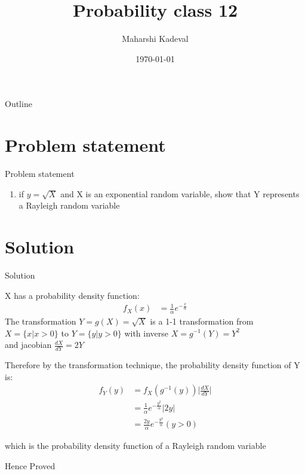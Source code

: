 \documentclass{beamer}
\title{Probability class 12}
\author{Maharshi Kadeval}
\date{\today}
\providecommand{\brak}[1]{\ensuremath{\left(#1\right)}}
\begin{document}
\begin{frame}
    \titlepage 
\end{frame}

\logo{}


\begin{frame}{Outline}
    \tableofcontents
\end{frame}


\section{Problem statement}
\begin{frame}{Problem statement}
\begin{enumerate}
\item if $y = \sqrt{X}$ and X is an exponential random variable, show that Y represents a Rayleigh random variable\\
\end{enumerate}

\end{frame}
\section{Solution}
\begin{frame}{Solution}

X has a probability density function:
\begin{align}
f_X\brak{x} &= \frac{1}{\alpha} e^{-\frac{x}{\alpha}}
\end{align}
The transformation $Y = g\brak{X} = \sqrt{X}$ is a 1-1 transformation from $X = \lbrace x|x>0 \rbrace$ to $Y = \lbrace y|y>0 \rbrace$ with inverse $X = g^{-1}\brak{Y} = Y^{2}$ \\
and jacobian $\frac{dX}{dY} = 2Y$\\
\end{frame}
\begin{frame}
Therefore by the transformation technique, the probability density function of Y is:
\begin{align}
f_Y\brak{y} &= f_X\brak{g^{-1}\brak{y}} \bigg | \frac{dX}{dY} \bigg | \\
&= \frac{1}{\alpha} e^{-\frac{y^{2}}{\alpha}} |2y|\\
&= \frac{2y}{\alpha} e^{-\frac{y^{2}}{\alpha}} 
\brak{y>0} 
\end{align}

which is the probability density function of a Rayleigh random variable\\
\begin{center}
Hence Proved
\end{center}

\end{frame}
\end{document}
